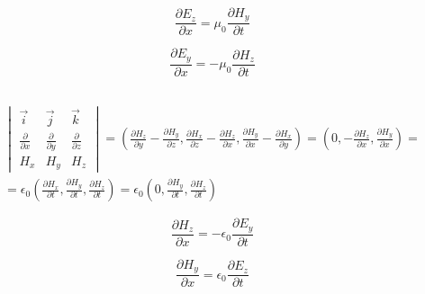 \documentclass[a4paper,12pt]{article}
\begin{document}
\begin{multicols}{2}
    \begin{equation}
        \frac{\partial E_z}{\partial x} = \mu_0 \frac{\partial H_y}{\partial t}
    \end{equation}

    \begin{equation}
        \frac{\partial E_y}{\partial x} = -\mu_0 \frac{\partial H_z}{\partial t}
    \end{equation}
\end{multicols}


\subsection{}
\begin{multline}
    \begin{vmatrix}
        \vec{i}                     & \vec{j}                     & \vec{k}                     \\
        \frac{\partial}{\partial x} & \frac{\partial}{\partial y} & \frac{\partial}{\partial z} \\
        H_x                         & H_y                         & H_z
    \end{vmatrix} = \left( \frac{\partial H_z}{\partial y} - \frac{\partial H_y}{\partial z}, \frac{\partial H_x}{\partial z} - \frac{\partial H_z}{\partial x}, \frac{\partial H_y}{\partial x} - \frac{\partial H_x}{\partial y} \right)
    = \left( 0, -\frac{\partial H_z}{\partial x}, \frac{\partial H_y}{\partial x} \right) = \\
    = \epsilon_0 \left( \frac{\partial H_x}{\partial t}, \frac{\partial H_y}{\partial t}, \frac{\partial H_z}{\partial t} \right) = \epsilon_0 \left( 0, \frac{\partial H_y}{\partial t}, \frac{\partial H_z}{\partial t} \right)
\end{multline}

\begin{multicols}{2}
    \begin{equation}
        \frac{\partial H_z}{\partial x} = -\epsilon_0 \frac{\partial E_y}{\partial t}
    \end{equation}

    \begin{equation}
        \frac{\partial H_y}{\partial x} = \epsilon_0 \frac{\partial E_z}{\partial t}
    \end{equation}
\end{multicols}

\newpage
\end{document}
